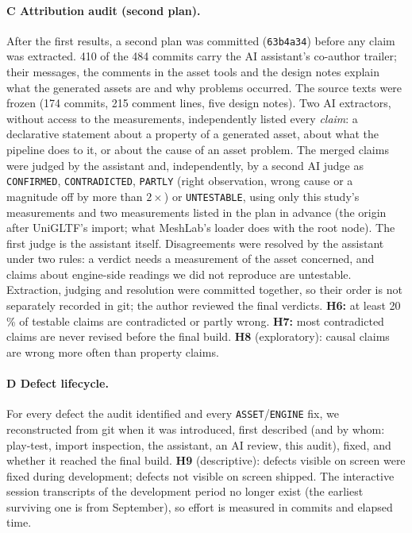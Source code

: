 \paragraph{C Attribution audit (second plan).} After the first results, a second
plan was committed (\texttt{63b4a34}) before any claim was extracted. 410 of the
484 commits carry the AI assistant's co-author trailer; their messages, the
comments in the asset tools and the design notes explain what the generated
assets are and why problems occurred. The source texts were frozen (174 commits,
215 comment lines, five design notes). Two AI extractors, without access to the
measurements, independently listed every \emph{claim}: a declarative statement
about a property of a generated asset, about what the pipeline does to it, or
about the cause of an asset problem. The merged claims were judged by the
assistant and, independently, by a second AI judge as \texttt{CONFIRMED},
\texttt{CONTRADICTED}, \texttt{PARTLY} (right observation, wrong cause or a
magnitude off by more than $2\times$) or \texttt{UNTESTABLE}, using only this
study's measurements and two measurements listed in the plan in advance (the
origin after UniGLTF's import; what MeshLab's loader does with the root node).
The first judge is the assistant itself. Disagreements were resolved by the
assistant under two rules: a verdict needs a measurement of the asset concerned,
and claims about engine-side readings we did not reproduce are untestable.
Extraction, judging and resolution were committed together, so their order is
not separately recorded in git; the author reviewed the final verdicts. \textbf{H6:} at least 20\,\% of testable claims are contradicted or
partly wrong. \textbf{H7:} most contradicted claims are never revised before the
final build. \textbf{H8} (exploratory): causal claims are wrong more often than
property claims.

\paragraph{D Defect lifecycle.} For every defect the audit identified and every
\texttt{ASSET}/\texttt{ENGINE} fix, we reconstructed from git when it was
introduced, first described (and by whom: play-test, import inspection, the
assistant, an AI review, this audit), fixed, and whether it reached the final
build. \textbf{H9} (descriptive): defects visible on screen were fixed during
development; defects not visible on screen shipped. The interactive session
transcripts of the development period no longer exist (the earliest surviving one
is from September), so effort is measured in commits and elapsed time.
